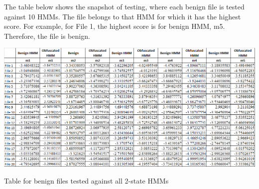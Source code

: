 The table below shows the snapshot of testing, where each benign file is tested against 10 HMMs. The file belongs to that HMM for which it has the highest score. For example, for File 1, the highest score is for benign HMM, m5. Therefore, the file is benign.   

\begin{table}
\centering
\includegraphics[width=1.0\textwidth]{images/duel.png}
\caption{Table for benign files tested against all 2-state HMMs} 
\label{table:Table for benign files tested against all 2-state HMMs}
\end{table}